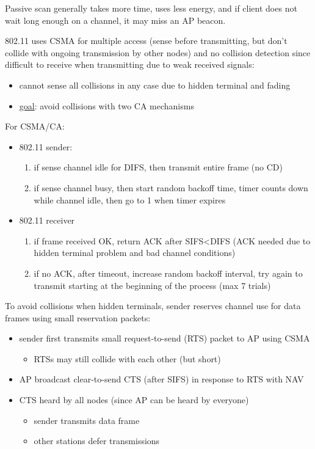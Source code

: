 \documentclass[11pt]{article}
\begin{document}
Passive scan generally takes more time, uses less energy, and if client does not wait long enough
on a channel, it may miss an AP beacon.

802.11 uses CSMA for multiple access (sense before transmitting, but don't collide with ongoing
transmission by other nodes) and no collision detection since difficult to receive when transmitting
due to weak received signals:
\begin{itemize}
\item cannot sense all collisions in any case due to hidden terminal and fading
\item \uline{goal}: avoid collisions with two CA mechanisms
\end{itemize}

For CSMA/CA:
\begin{itemize}
\item 802.11 sender:
\begin{enumerate}
\item if sense channel idle for DIFS, then transmit entire frame (no CD)
\item if sense channel busy, then start random backoff time, timer counts down while channel idle,
then go to 1 when timer expires
\end{enumerate}
\item 802.11 receiver
\begin{enumerate}
\item if frame received OK, return ACK after SIFS<DIFS (ACK needed due to hidden terminal problem and
bad channel conditions)
\item if no ACK, after timeout, increase random backoff interval, try again to transmit starting at
the beginning of the process (max 7 trials)
\end{enumerate}
\end{itemize}

To avoid collisions when hidden terminals, sender reserves channel use for data frames using
small reservation packets:
\begin{itemize}
\item sender first transmits small request-to-send (RTS) packet to AP using CSMA
\begin{itemize}
\item RTSs may still collide with each other (but short)
\end{itemize}
\item AP broadcast clear-to-send CTS (after SIFS) in response to RTS with NAV
\item CTS heard by all nodes (since AP can be heard by everyone)
\begin{itemize}
\item sender transmits data frame
\item other stations defer transmissions
\end{itemize}
\end{itemize}
\end{document}
